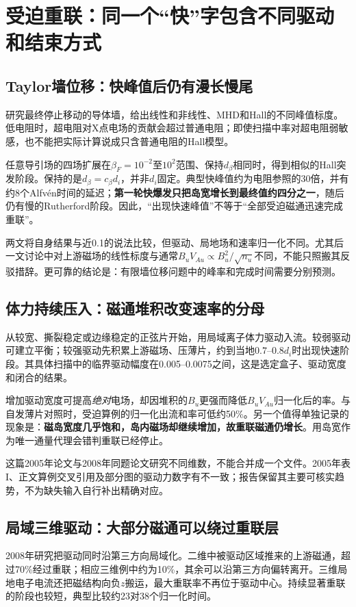 \section{受迫重联：同一个“快”字包含不同驱动和结束方式}
\subsection{Taylor墙位移：快峰值后仍有漫长慢尾}
\citet{L057}研究最终停止移动的导体墙，给出线性和非线性、MHD和Hall的不同峰值标度。低电阻时，超电阻对X点电场的贡献会超过普通电阻；即使扫描中率对超电阻弱敏感，也不能把实际计算说成只含普通电阻的Hall模型。

任意导引场的四场扩展在$\beta_F=10^{-2}$至$10^2$范围、保持$d_\beta$相同时，得到相似的Hall突发阶段。保持的是$d_\beta=c_\beta d_i$，并非$d_i$固定。典型快峰值约为电阻参照的30倍，并有约8个Alfvén时间的延迟；\textbf{第一轮快爆发只把岛宽增长到最终值约四分之一}，随后仍有慢的Rutherford阶段。因此，“出现快速峰值”不等于“全部受迫磁通迅速完成重联”。\citep{L058}

两文将自身结果与近0.1的说法比较，但驱动、局地场和速率归一化不同。尤其后一文讨论中对上游磁场的线性标度与通常$B_uV_{Au}\propto B_u^2/\sqrt{n_u}$不同，不能只照搬其反驳措辞。更可靠的结论是：有限墙位移问题中的峰率和完成时间需要分别预测。

\subsection{体力持续压入：磁通堆积改变速率的分母}
\citet{L076}从较宽、撕裂稳定或边缘稳定的正弦片开始，用局域离子体力驱动入流。较弱驱动可建立平衡；较强驱动先积累上游磁场、压薄片，约到当地$0.7$--$0.8d_i$时出现快速阶段。其具体扫描中的临界驱动幅度在0.005--0.0075之间，这是选定盒子、驱动宽度和闭合的结果。

增加驱动宽度可提高\emph{绝对}电场，却因堆积的$B_u$更强而降低$B_uV_{Au}$归一化后的率。与自发薄片对照时，受迫算例的归一化出流和率可低约50\%。另一个值得单独记录的现象是：\textbf{磁岛宽度几乎饱和，岛内磁场却继续增加，故重联磁通仍增长}。用岛宽作为唯一通量代理会错判重联已经停止。

这篇2005年论文与2008年同题论文研究不同维数，不能合并成一个文件。2005年表I、正文算例交叉引用及部分图的驱动力数字有不一致；报告保留其主要可核实趋势，不为缺失输入自行补出精确对应。

\subsection{局域三维驱动：大部分磁通可以绕过重联层}
2008年研究把驱动同时沿第三方向局域化。二维中被驱动区域推来的上游磁通，超过70\%经过重联；相应三维例中约为10\%，其余可以沿第三方向偏转离开。三维局地电子电流还把磁结构向负$z$搬运，最大重联率不再位于驱动中心。持续显著重联的阶段也较短，典型比较约23对38个归一化时间。\citep{F717}

